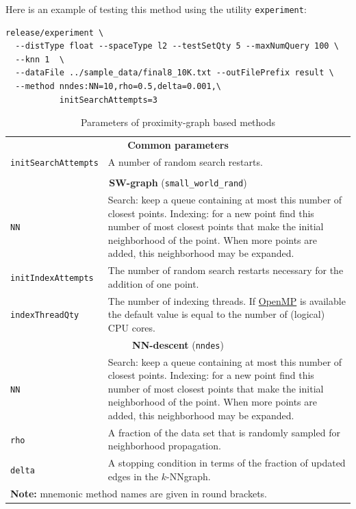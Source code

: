 \documentclass[runningheads,a4paper]{llncs}
\newcommand{\ttt}[1]{\texttt{#1}}
\newcommand{\knnns}{$k$-NN}
\begin{document}
Here is an example of testing this method using the utility \ttt{experiment}:
{
\footnotesize
\begin{verbatim}
release/experiment \
  --distType float --spaceType l2 --testSetQty 5 --maxNumQuery 100 \
  --knn 1  \
  --dataFile ../sample_data/final8_10K.txt --outFilePrefix result \
  --method nndes:NN=10,rho=0.5,delta=0.001,\
           initSearchAttempts=3
\end{verbatim}
}

\begin{table}
\caption{Parameters of proximity-graph based methods\label{TableProxGraphs}}
\centering
\begin{tabular}{l@{\hspace{2mm}}p{3.5in}}
\toprule
\multicolumn{2}{c}{\textbf{Common parameters}}\\
\cmidrule(l){1-2} 
\ttt{initSearchAttempts}  & A number of random search restarts. \\
\\
\cmidrule(l){1-2} 
\multicolumn{2}{c}{\textbf{SW-graph} (\ttt{small\_world\_rand}) \cite{malkov2012scalable,malkov2014}  }\\
\cmidrule(l){1-2} 
\ttt{NN}                  & Search: keep a queue containing at most this number of closest points. 
                            Indexing: for a new point find this number of most closest points
                            that make the initial neighborhood of the point. When more points are added,
                            this neighborhood may be expanded. \\
\ttt{initIndexAttempts}   & The number of random search restarts necessary for the addition of one point.\\
\ttt{indexThreadQty}      & The number of indexing threads. If \href{http://openmp.org/wp/}{OpenMP}  is available the default value is
                            equal to the number of (logical) CPU cores. \\
\cmidrule(l){1-2} 
\multicolumn{2}{c}{\textbf{NN-descent} (\ttt{nndes}) \cite{dong2011efficient,malkov2012scalable,malkov2014}  }\\
\cmidrule(l){1-2} 
\ttt{NN}                  & Search: keep a queue containing at most this number of closest points. 
                            Indexing: for a new point find this number of most closest points
                            that make the initial neighborhood of the point. When more points are added,
                            this neighborhood may be expanded. \\
\ttt{rho}                 & A fraction of the data set that is randomly sampled for neighborhood propagation.  \\
\ttt{delta}               & A stopping condition in terms of the fraction of updated edges in the \knnns graph. \\
\bottomrule
\multicolumn{2}{l}{\textbf{Note:} mnemonic method names are given in round brackets.}
\end{tabular}
\end{table}
\end{document}
